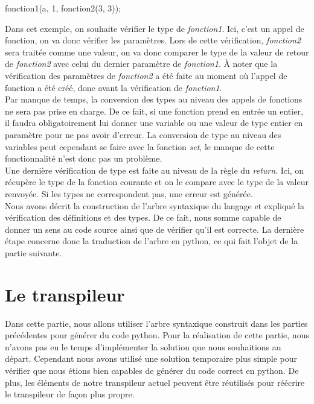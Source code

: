 \documentclass[a4paper]{article}%
\begin{document}
\begin{grammar}[language=C++]
  fonction1(a, 1, fonction2(3, 3));
\end{grammar}\leavevmode\newline

Dans cet exemple, on souhaite vérifier le type de \textit{fonction1}. Ici,
c'est un appel de fonction, on va donc vérifier les paramètres. Lors de cette
vérification, \textit{fonction2} sera traitée comme une valeur, on va donc
comparer le type de la valeur de retour de \textit{fonction2} avec celui du
dernier paramètre de \textit{fonction1}. À noter que la vérification des
paramètres de \textit{fonction2} a été faite au moment où l'appel de fonction a
été créé, donc avant la vérification de \textit{fonction1}.\\

Par manque de temps, la conversion des types au niveau des appels de fonctions
ne sera pas prise en charge. De ce fait, si une fonction prend en entrée un
entier, il faudra obligatoirement lui donner une variable ou une valeur de type
entier en paramètre pour ne pas avoir d'erreur. La conversion de type au niveau
des variables peut cependant se faire avec la fonction \textit{set}, le manque
de cette fonctionnalité n'est donc pas un problème.\\

Une dernière vérification de type est faite au niveau de la règle du
\textit{return}. Ici, on récupère le type de la fonction courante et on le
compare avec le type de la valeur renvoyée. Si les types ne correspondent pas,
une erreur est générée.\\

Nous avons décrit la construction de l'arbre syntaxique du langage et expliqué
la vérification des définitions et des types. De ce fait, nous somme capable de
donner un sens au code source ainsi que de vérifier qu'il est correcte. La
dernière étape concerne donc la traduction de l'arbre en python, ce qui fait
l'objet de la partie suivante.

\clearpage
\section{Le transpileur}

Dans cette partie, nous allons utiliser l'arbre syntaxique construit dans les
parties précédentes pour générer du code python. Pour la réalisation de cette
partie, nous n'avons pas eu le temps d'implémenter la solution que nous
souhaitions au départ. Cependant nous avons utilisé une solution temporaire
plus simple pour vérifier que nous étions bien capables de générer du code
correct en python. De plus, les éléments de notre transpileur actuel peuvent
être réutilisés pour réécrire le transpileur de façon plus propre.
\end{document}
